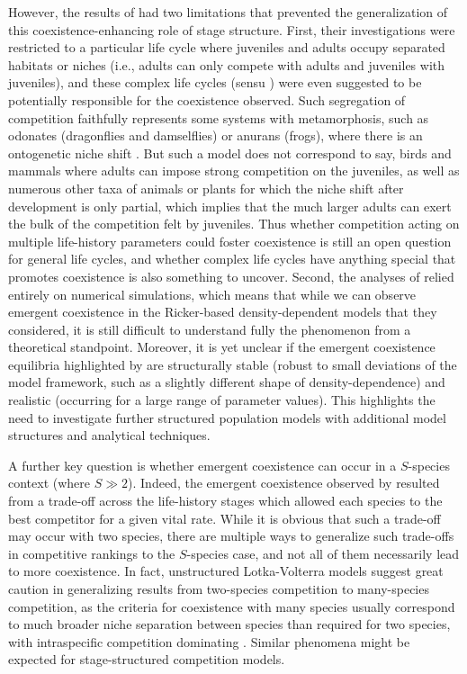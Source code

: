 \documentclass{article}
\begin{document}
However, the results of \citet{moll2008competition} had two limitations that prevented the generalization of this coexistence-enhancing role of stage structure. First, their investigations were restricted to a particular life cycle where juveniles and adults occupy separated habitats or niches (i.e., adults can only compete with adults and juveniles with juveniles), and these complex life cycles (sensu \citealt{wilbur1980complex}) were even suggested to be potentially responsible for the coexistence observed. Such segregation of competition faithfully represents some systems with metamorphosis, such as odonates (dragonflies and damselflies) or anurans (frogs), where there is an ontogenetic niche shift \citep{werner1984ontogenetic}. But such a model does not correspond to say, birds and mammals where adults can impose strong competition on the juveniles, as well as numerous other taxa of animals or plants for which the niche shift after development is only partial, which implies that the much larger adults can exert the bulk of the competition felt by juveniles. Thus whether competition acting on multiple life-history parameters could foster coexistence is still an open question for general life cycles, and whether complex life cycles have anything special that promotes coexistence is also something to uncover. Second, the analyses of \citet{moll2008competition} relied entirely on numerical simulations, which means that while we can observe emergent coexistence in the Ricker-based density-dependent models that they considered, it is still difficult to understand fully the phenomenon from a theoretical standpoint. Moreover, it is yet unclear if the emergent coexistence equilibria highlighted by \citet{moll2008competition} are structurally stable (robust to small deviations of the model framework, such as a slightly different shape of density-dependence) and realistic (occurring for a large range of parameter values). This highlights the need to investigate further structured population models with additional model structures and analytical techniques.

A further key question is whether emergent coexistence can occur in a  $S$-species context (where $S\gg2$). Indeed, the emergent coexistence observed by \citet{moll2008competition} resulted from a trade-off across the life-history stages which allowed each species to the best competitor for a given vital rate. While it is obvious that such a trade-off may occur with two species, there are multiple ways to generalize such trade-offs in competitive rankings to the $S$-species case, and not all of them necessarily lead to more coexistence. In fact, unstructured Lotka-Volterra models suggest great caution in generalizing results from two-species competition to many-species competition, as the criteria for coexistence with many species usually correspond to much broader niche separation between species than required for two species, with intraspecific competition dominating \citep{barabas2016effect}. Similar phenomena might be expected for stage-structured competition models.
\end{document}
